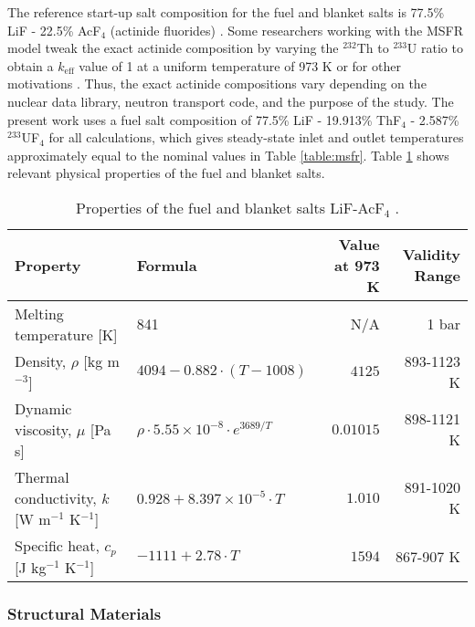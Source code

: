 The reference start-up salt composition for the fuel and blanket salts is
77.5\% LiF - 22.5\% AcF$_4$ (actinide fluorides)
\cite{merle-lucotte_launching_2011}. Some researchers working with the
\gls{MSFR} model tweak the exact actinide composition by varying the
$^{232}$Th to $^{233}$U ratio to obtain a $k_{\text{eff}}$ value of 1 at a
uniform temperature of 973 K \cite{brovchenko_neutronic_2019} or for other
motivations \cite{fiorina_molten_2013} \cite{pettersen_coupled_2016}. Thus,
the exact actinide compositions vary depending on the nuclear data library,
neutron transport code, and the purpose of the study. The present work uses
a fuel salt composition of 77.5\% LiF - 19.913\% ThF$_4$ - 2.587\%
$^{233}$UF$_4$ for all calculations, which gives steady-state inlet and outlet
temperatures approximately equal to the nominal values in Table
\ref{table:msfr}. Table \ref{table:prip} shows relevant physical properties of
the fuel and blanket salts.
%
\begin{table}[htb!]
\small
\centering
\caption{Properties of the fuel and blanket salts LiF-AcF$_4$
\cite{brovchenko_neutronic_2019}.}
\begin{tabular}{l l r r}
\toprule
Property & Formula & {Value at 973 K} & Validity Range\\
\midrule
Melting temperature [K] & 841 & {N/A} & 1 bar \\
Density, $\rho$ [kg m$^{-3}$] & $4094-0.882 \cdot (T-1008)$ & $4125$ & 893-1123 K \\
Dynamic viscosity, $\mu$ [Pa s] & $\rho \cdot 5.55 \times 10^{-8} \cdot e^{3689/T}$ & $0.01015$ & 898-1121 K \\
Thermal conductivity, $k$ [W m$^{-1}$ K$^{-1}$] & $0.928+8.397 \times 10^{-5} \cdot T$ & $1.010$ & 891-1020 K \\
Specific heat, $c_p$ [J kg$^{-1}$ K$^{-1}$] & $-1111+2.78\cdot T$ & $1594$ & 867-907 K \\
\bottomrule
\end{tabular}
\label{table:prip}
\end{table}

\subsubsection{Structural Materials}

